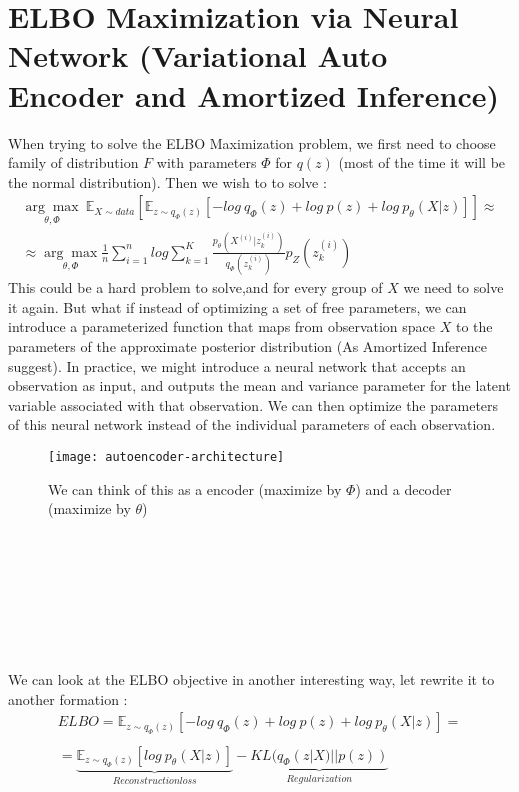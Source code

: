 \section*{ELBO Maximization via Neural Network (Variational Auto Encoder and Amortized Inference)}
When trying to solve the ELBO Maximization problem, we first need to choose family of distribution $F$ with parameters $\Phi$ for $q(z)$ (most of the time it will be the normal distribution). Then we wish to to solve : 
\begin{gather*}
\underset{\theta, \Phi}{\arg\max} \ \mathbb{E}_{X\sim data}[\mathbb{E}_{z \sim q_{\Phi}(z)}[-log \ q_{\Phi}(z) + log \ p(z) + log \ p_{\theta}(X|z)]] \approx \\
\approx \underset{\theta, \Phi}{\arg\max} \frac{1}{n}\sum_{i=1}^{n}log \sum_{k=1}^{K}\frac{p_{\theta}(X^{(i)}|z_{k}^{(i)})}{q_{\Phi}(z_{k}^{(i)})}p_{Z}(z_{k}^{(i)})
\end{gather*}
This could be a hard problem to solve,and for every group of $X$ we need to solve it again. But what if instead of optimizing a set of free parameters, we can introduce a parameterized function that maps from observation space $X$ to the parameters of the approximate posterior distribution (As Amortized Inference suggest). In practice, we might introduce a neural network that accepts an observation as input, and outputs the mean and variance parameter for the latent variable associated with that observation. We can then optimize the parameters of this neural network instead of the individual parameters of each observation.  
\begin{figure}[t]
\texttt{[image: autoencoder-architecture]}
\caption{We can think of this as a encoder (maximize by $\Phi$) and a decoder (maximize by $\theta$)}
\centering
\end{figure}
\\ \\ \\ \\ \\ \\ \\
We can look at the ELBO objective in another interesting way, let rewrite it to another formation :
\begin{gather*}
ELBO=\mathbb{E}_{z \sim q_{\Phi}(z)}[-log \ q_{\Phi}(z) + log \ p(z) + log \ p_{\theta}(X|z)] = \\ \\
= \underbrace{\mathbb{E}_{z \sim q_{\Phi}(z)}[log \ p_{\theta}(X|z)]}_{Reconstruction loss} - \underbrace{KL(q_{\Phi}(z|X)||p(z))}_{Regularization}
\end{gather*}
